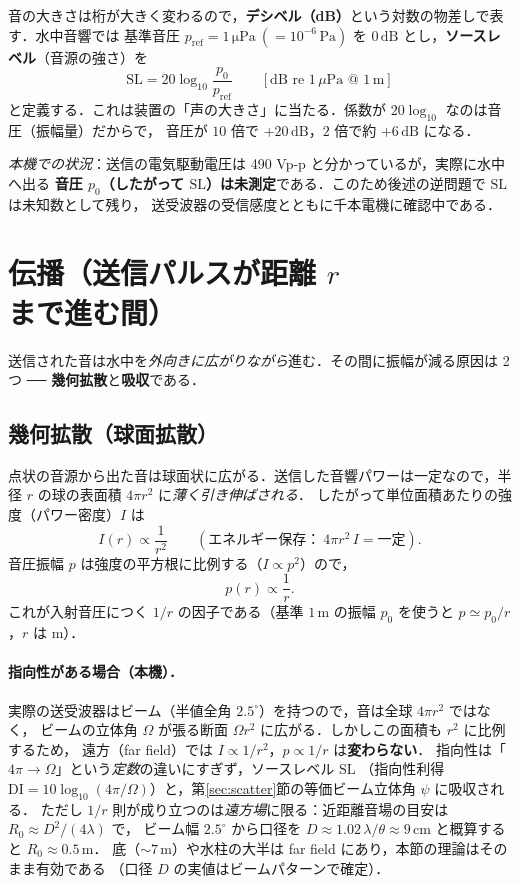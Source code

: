\documentclass[11pt]{ltjsarticle}
\newcommand{\unit}[1]{\,\mathrm{#1}}
\begin{document}
音の大きさは桁が大きく変わるので，\textbf{デシベル（dB）}という対数の物差しで表す．水中音響では
基準音圧 $p_{\mathrm{ref}}=1\unit{\mu Pa}\ (=10^{-6}\unit{Pa})$ を $0\unit{dB}$ とし，\textbf{ソースレベル}（音源の強さ）を
\begin{equation}
\mathrm{SL}=20\log_{10}\frac{p_0}{p_{\mathrm{ref}}}\qquad[\text{dB re }1\,\mu\text{Pa @ }1\,\text{m}]
\end{equation}
と定義する．これは装置の「声の大きさ」に当たる．係数が $20\log_{10}$ なのは音圧（振幅量）だからで，
音圧が $10$ 倍で $+20\unit{dB}$，$2$ 倍で約 $+6\unit{dB}$ になる．

\emph{本機での状況}：送信の電気駆動電圧は 490 Vp-p と分かっているが，実際に水中へ出る
\textbf{音圧 $p_0$（したがって $\mathrm{SL}$）は未測定}である．このため後述の逆問題で $\mathrm{SL}$ は未知数として残り，
送受波器の受信感度とともに千本電機に確認中である．

\section{伝播（送信パルスが距離 $r$ まで進む間）}
送信された音は水中を\emph{外向きに広がりながら}進む．その間に振幅が減る原因は 2 つ ── \textbf{幾何拡散}と\textbf{吸収}である．

\subsection{幾何拡散（球面拡散）}
点状の音源から出た音は球面状に広がる．送信した音響パワーは一定なので，半径 $r$ の球の表面積 $4\pi r^2$ に\emph{薄く引き伸ばされる}．
したがって単位面積あたりの強度（パワー密度）$I$ は
\begin{equation}
I(r)\propto\frac{1}{r^2}\qquad(\text{エネルギー保存：}\ 4\pi r^2\,I=\text{一定}).
\end{equation}
音圧振幅 $p$ は強度の平方根に比例する（$I\propto p^2$）ので，
\begin{equation}
p(r)\propto\frac{1}{r}.
\end{equation}
これが入射音圧につく $1/r$ の因子である（基準 $1\unit{m}$ の振幅 $p_0$ を使うと $p\simeq p_0/r$，$r$ は m）．

\paragraph{指向性がある場合（本機）．}
実際の送受波器はビーム（半値全角 $2.5^\circ$）を持つので，音は全球 $4\pi r^2$ ではなく，
ビームの立体角 $\Omega$ が張る断面 $\Omega r^2$ に広がる．しかしこの面積も $r^2$ に比例するため，
遠方（far field）では $I\propto 1/r^2$，$p\propto 1/r$ は\textbf{変わらない}．
指向性は「$4\pi\!\to\!\Omega$」という\emph{定数}の違いにすぎず，ソースレベル $\mathrm{SL}$
（指向性利得 $\mathrm{DI}=10\log_{10}(4\pi/\Omega)$）と，第\ref{sec:scatter}節の等価ビーム立体角 $\psi$ に吸収される．
ただし $1/r$ 則が成り立つのは\emph{遠方場}に限る：近距離音場の目安は $R_0\approx D^2/(4\lambda)$ で，
ビーム幅 $2.5^\circ$ から口径を $D\approx 1.02\,\lambda/\theta\approx 9\unit{cm}$ と概算すると $R_0\approx 0.5\unit{m}$．
底（$\sim 7\unit{m}$）や水柱の大半は far field にあり，本節の理論はそのまま有効である
（口径 $D$ の実値はビームパターンで確定）．
\end{document}
